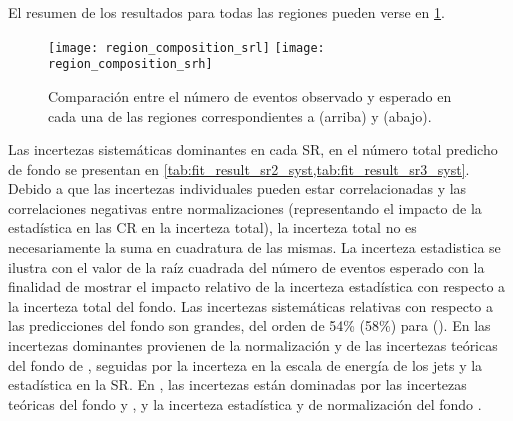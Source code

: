El resumen de los resultados para todas las regiones pueden verse en
\cref{fig:fit_region_composition}.


\begin{figure}[!htbp]
  \centering

  \texttt{[image: region\_composition\_srl]}
  \texttt{[image: region\_composition\_srh]}

  \caption{Comparación entre el número de eventos observado y esperado en cada
    una de las regiones correspondientes a {\SRL} (arriba) y {\SRH} (abajo).}

  \label{fig:fit_region_composition}

\end{figure}


Las incertezas sistemáticas dominantes en cada SR, en el número total predicho de fondo
se presentan en \cref{tab:fit_result_sr2_syst,tab:fit_result_sr3_syst}.
Debido a que las incertezas individuales pueden estar correlacionadas y las
correlaciones negativas entre normalizaciones (representando el impacto de la
estadística en las CR en la incerteza total), la incerteza total no es
necesariamente la suma en cuadratura de las mismas.
La incerteza estadistica se ilustra con el valor de la raíz cuadrada del número de eventos esperado con
la finalidad de mostrar el impacto relativo de la incerteza estadística con respecto a la
incerteza total del fondo. Las incertezas sistemáticas relativas con respecto a
las predicciones del fondo son grandes, del orden de 54\% (58\%) para {\SRL}
(\SRH). En {\SRL} las incertezas dominantes provienen de la
normalización y de las incertezas teóricas del fondo de {\ttgam}, seguidas por la
incerteza en la escala de energía de los jets y la estadística en la SR. En
{\SRH}, las incertezas están dominadas por las incertezas teóricas del fondo
{\zgam} y {\gjet}, y la incerteza estadística y de normalización del fondo
{\wgam}.


